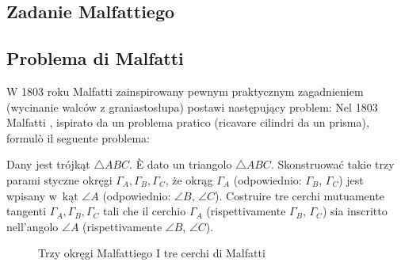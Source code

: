 %

\subsection{Zadanie Malfattiego} %
\subsection{Problema di Malfatti} %

W 1803 roku Malfatti \cite{malfatti_1803} zainspirowany pewnym praktycznym zagadnieniem (wycinanie walców z graniastosłupa) postawi następujący problem: %
Nel 1803 Malfatti \cite{malfatti_1803}, ispirato da un problema pratico (ricavare cilindri da un prisma), formulò il seguente problema: %
%

\begin{problem}
	\label{malfatti_problem}
	Dany jest trójkąt $\triangle ABC$. %
	È dato un triangolo $\triangle ABC$. %
	Skonstruować takie trzy parami styczne okręgi $\Gamma_A, \Gamma_B, \Gamma_C$, że okrąg $\Gamma_A$ (odpowiednio: $\Gamma_B$, $\Gamma_C$) jest wpisany w~kąt $\angle A$ (odpowiednio: $\angle B$, $\angle C$). %
	Costruire tre cerchi mutuamente tangenti $\Gamma_A, \Gamma_B, \Gamma_C$ tali che il cerchio $\Gamma_A$ (rispettivamente $\Gamma_B$, $\Gamma_C$) sia inscritto nell'angolo $\angle A$ (rispettivamente $\angle B$, $\angle C$). %
\end{problem}

\begin{figure}[H] \centering

\caption{%
Trzy okręgi Malfattiego%
I tre cerchi di Malfatti%
}%
\end{figure}

